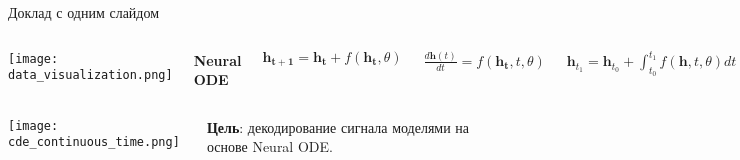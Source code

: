 \documentclass{beamer}
\begin{document}
\begin{frame}{Доклад с одним слайдом}



\begin{columns}[c]
\texttt{[image: data\_visualization.png]}

\Large{\textbf{Neural ODE}}

\normalsize
\bigskip


$\mathbf{h_{t+1}} = \mathbf{h_t} + f(\mathbf{h_t}, \theta)$

\large

\bigskip


$\frac{d\mathbf{h}(t)}{dt} = f(\mathbf{h_t}, t, \theta)$

\normalsize
\bigskip 

$\mathbf{h}_{t_1} = \mathbf{h}_{t_0} + \int_{t_0}^{t_1} f(\mathbf{h}, t, \theta) dt$


\end{columns}
\begin{columns}[c]
\texttt{[image: cde\_continuous\_time.png]}
\large

\textbf{Цель}: декодирование сигнала моделями на основе Neural ODE.

\end{columns}

\end{frame}
\end{document}

